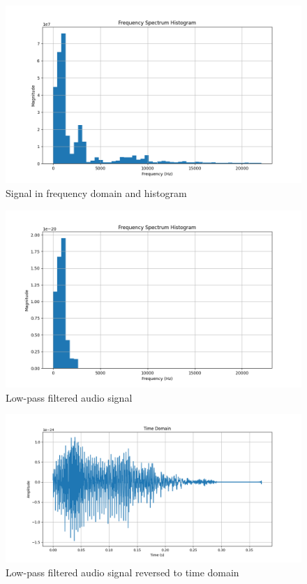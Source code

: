 \documentclass[a4paper,12pt,fleqn]{article}
\begin{document}
\begin{figure}[H]
    \centering
    \includegraphics[width=1\textwidth]{ex4_spectrum_histogram.png}
    \caption{Signal in frequency domain and histogram}
    \label{fig:ex4_hist}
\end{figure}
\begin{figure}[H]
    \centering
    \includegraphics[width=1\textwidth]{ex4_low_pass_filter.png}
    \caption{Low-pass filtered audio signal}
    \label{fig:ex4_low}
\end{figure}
\begin{figure}[H]
    \centering
    \includegraphics[width=1\textwidth]{ex4_low_pass_filter_time_domain.png}
    \caption{Low-pass filtered audio signal reversed to time domain}
    \label{fig:ex4_low_hist}
\end{figure}
\end{document}
